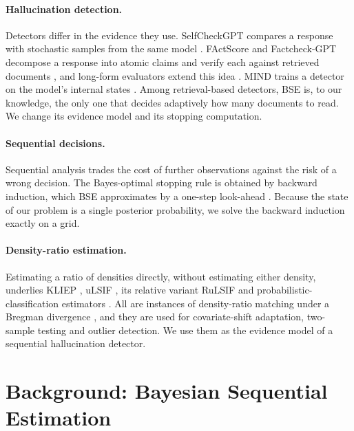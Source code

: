 \documentclass[11pt]{article}
\begin{document}
\paragraph{Hallucination detection.} Detectors differ in the evidence they
use. SelfCheckGPT compares a response with stochastic samples from the same
model \citep{manakul-etal-2023-selfcheckgpt}. FActScore and Factcheck-GPT
decompose a response into atomic claims and verify each against retrieved
documents \citep{min-etal-2023-factscore,wang-etal-2024-factcheck}, and
long-form evaluators extend this idea \citep{wei2024longform}. MIND trains a
detector on the model's internal states \citep{su-etal-2024-unsupervised}.
Among retrieval-based detectors, BSE \citep{wang-etal-2023-hallucination} is,
to our knowledge, the only one that decides adaptively how many documents to
read. We change its evidence model and its stopping computation.

\paragraph{Sequential decisions.} Sequential analysis
\citep{wald1945sequential} trades the cost of further observations against
the risk of a wrong decision. The Bayes-optimal stopping rule is obtained by
backward induction, which BSE approximates by a one-step look-ahead
\citep{cardillo1968suboptimal}. Because the state of our problem is a single
posterior probability, we solve the backward induction exactly on a grid.

\paragraph{Density-ratio estimation.} Estimating a ratio of densities
directly, without estimating either density, underlies KLIEP
\citep{sugiyama2007kliep}, uLSIF \citep{kanamori2009ulsif}, its relative
variant RuLSIF \citep{yamada2011rulsif} and probabilistic-classification
estimators \citep{bickel2009discriminative}. All are instances of
density-ratio matching under a Bregman divergence
\citep{sugiyama2012bregman,sugiyama2012density}, and they are used for
covariate-shift adaptation, two-sample testing and outlier detection. We use
them as the evidence model of a sequential hallucination detector.

\section{Background: Bayesian Sequential Estimation}
\label{sec:bse}
\end{document}
